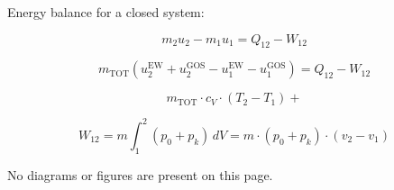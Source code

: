 Energy balance for a closed system:  

\[
m_2 u_2 - m_1 u_1 = Q_{12} - W_{12}
\]

\[
m_{\text{TOT}} \left( u_2^{\text{EW}} + u_2^{\text{GOS}} - u_1^{\text{EW}} - u_1^{\text{GOS}} \right) = Q_{12} - W_{12}
\]

\[
m_{\text{TOT}} \cdot c_V \cdot (T_2 - T_1) +
\]

\[
W_{12} = m \int_1^2 (p_0 + p_k) \, dV = m \cdot (p_0 + p_k) \cdot (v_2 - v_1)
\]  

No diagrams or figures are present on this page.